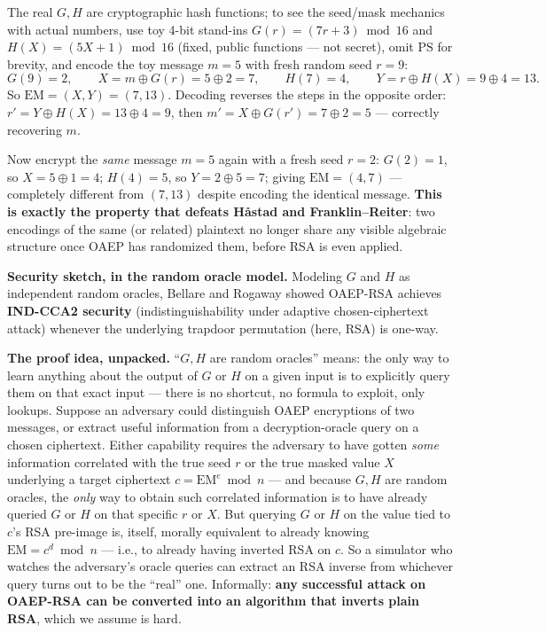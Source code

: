 \begin{example}
The real $G,H$ are cryptographic hash functions; to see the seed/mask mechanics with actual numbers, use toy 4-bit stand-ins $G(r) = (7r+3) \bmod 16$ and $H(X) = (5X+1) \bmod 16$ (fixed, public functions — not secret), omit $\text{PS}$ for brevity, and encode the toy message $m=5$ with fresh random seed $r=9$:
\[
G(9) = 2, \qquad X = m \oplus G(r) = 5 \oplus 2 = 7, \qquad H(7) = 4, \qquad Y = r \oplus H(X) = 9 \oplus 4 = 13.
\]
So $\text{EM} = (X,Y) = (7,13)$. Decoding reverses the steps in the opposite order: $r' = Y \oplus H(X) = 13 \oplus 4 = 9$, then $m' = X \oplus G(r') = 7 \oplus 2 = 5$ — correctly recovering $m$.

Now encrypt the \emph{same} message $m=5$ again with a fresh seed $r=2$: $G(2)=1$, so $X = 5 \oplus 1 = 4$; $H(4)=5$, so $Y = 2 \oplus 5 = 7$; giving $\text{EM}=(4,7)$ — completely different from $(7,13)$ despite encoding the identical message. \textbf{This is exactly the property that defeats Håstad and Franklin--Reiter}: two encodings of the same (or related) plaintext no longer share any visible algebraic structure once OAEP has randomized them, before RSA is even applied.
\end{example}

\medskip\noindent\textbf{Security sketch, in the random oracle model.} Modeling $G$ and $H$ as independent random oracles, Bellare and Rogaway showed OAEP-RSA achieves \textbf{IND-CCA2 security} (indistinguishability under adaptive chosen-ciphertext attack) whenever the underlying trapdoor permutation (here, RSA) is one-way.

\medskip\noindent\textbf{The proof idea, unpacked.} ``$G,H$ are random oracles'' means: the only way to learn anything about the output of $G$ or $H$ on a given input is to explicitly query them on that exact input — there is no shortcut, no formula to exploit, only lookups. Suppose an adversary could distinguish OAEP encryptions of two messages, or extract useful information from a decryption-oracle query on a chosen ciphertext. Either capability requires the adversary to have gotten \emph{some} information correlated with the true seed $r$ or the true masked value $X$ underlying a target ciphertext $c=\text{EM}^e\bmod n$ — and because $G,H$ are random oracles, the \emph{only} way to obtain such correlated information is to have already queried $G$ or $H$ on that specific $r$ or $X$. But querying $G$ or $H$ on the value tied to $c$'s RSA pre-image is, itself, morally equivalent to already knowing $\text{EM}=c^d\bmod n$ — i.e., to already having inverted RSA on $c$. So a simulator who watches the adversary's oracle queries can extract an RSA inverse from whichever query turns out to be the ``real'' one. Informally: \textbf{any successful attack on OAEP-RSA can be converted into an algorithm that inverts plain RSA}, which we assume is hard.

